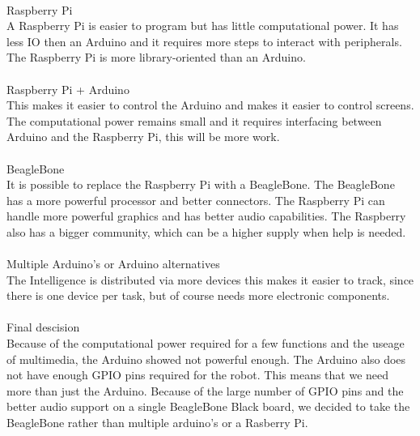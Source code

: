 \documentclass[11pt,twoside,a4paper]{report}
\begin{document}
\\
Raspberry Pi\\
A Raspberry Pi is easier to program but has little computational power. It has less IO then an Arduino and it requires more steps to interact with peripherals. The Raspberry Pi is more library-oriented than an Arduino.\\
\\
Raspberry Pi + Arduino\\
This makes it easier to control the Arduino and makes it easier to control screens. The computational power remains small and it requires interfacing between Arduino and the Raspberry Pi, this will be more work. \\
\\
BeagleBone\\
It is possible to replace the Raspberry Pi with a BeagleBone. The BeagleBone has a more powerful processor and better connectors. The Raspberry Pi can handle more powerful graphics and has better audio capabilities. The Raspberry also has a bigger community, which can be a higher supply when help is needed. \\
\\
Multiple Arduino’s or Arduino alternatives\\
The Intelligence is distributed via more devices this makes it easier to track, since there is one device per task, but of course needs more electronic components. \\
\\
Final descision\\
Because of the computational power required for a few functions and the useage of multimedia, the Arduino showed not powerful enough. The Arduino also does not have enough GPIO pins required for the robot. This means that we need more than just the Arduino. Because of the large number of GPIO pins and the better audio support on a single BeagleBone Black board, we decided to take the BeagleBone rather than multiple arduino’s or a Rasberry Pi.

\newpage
\end{document}
